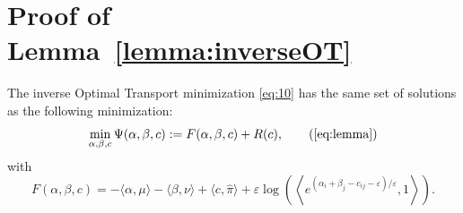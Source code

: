 \section{Proof of Lemma~\ref{lemma:inverseOT}}
\label{sec:prooflemmainverseOT}
\begin{lemma}
	The inverse Optimal Transport minimization \eqref{eq:10} has the same set of solutions as the following minimization:
	\begin{equation}
		\min _{\alpha, \beta, c} \Psi(\alpha, \beta, c):=F(\alpha, \beta, c)+R(c) , \tag{\ref{eq:lemma}}
	\end{equation}
	with
	\[ F(\alpha, \beta, c)=-\langle\alpha, \mu\rangle-\langle\beta, \nu\rangle+\langle c, \hat{\pi}\rangle+\varepsilon \log \left(\left\langle e^{\left(\alpha_{i}+\beta_{j}-c_{i j}-\varepsilon\right) / \varepsilon}, 1\right\rangle\right) .\]
\end{lemma}
